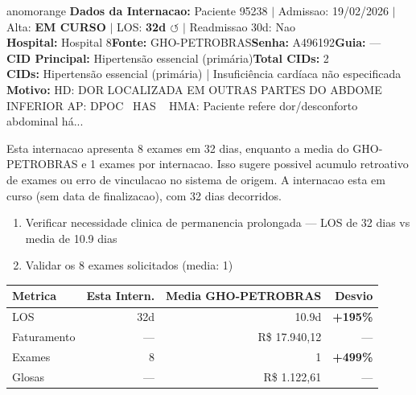 \documentclass[a4paper,10pt]{article}
\begin{document}
\begin{anomalycard}[Internacao 165987 | GHO-PETROBRAS | ALTO (z=3.84)]{anomorange}
\textbf{Dados da Internacao:} Paciente 95238 $\mid$ Admissao: 19/02/2026 $\mid$ Alta: \textcolor{anomorange}{\textbf{EM CURSO}} $\mid$ LOS: \textbf{32d \textcolor{anomorange}{$\circlearrowleft$}} $\mid$ Readmissao 30d: Nao\\
\textbf{Hospital:} Hospital 8\quad\textbf{Fonte:} GHO-PETROBRAS\quad\textbf{Senha:} A496192\quad\textbf{Guia:} ---\\
\textbf{CID Principal:} {\small Hipertensão essencial (primária)}\quad\textbf{Total CIDs:} 2\\

\textbf{CIDs:} {\scriptsize Hipertensão essencial (primária) | Insuficiência cardíaca não especificada}\\

\textbf{Motivo:} {\scriptsize HD:  DOR LOCALIZADA EM OUTRAS PARTES DO ABDOME INFERIOR  AP: DPOC   HAS    HMA: Paciente refere dor/desconforto abdominal há...}\\

\vspace{2pt}\begin{tcolorbox}[colback=severityred!20,colframe=anomorange,title={\textbf{Interpretacao de Negocio}},fonttitle=\bfseries\small,left=4pt,right=4pt,top=3pt,bottom=3pt]
{\small Esta internacao apresenta 8 exames em 32 dias, enquanto a media do GHO-PETROBRAS e 1 exames por internacao. Isso sugere possivel acumulo retroativo de exames ou erro de vinculacao no sistema de origem. A internacao esta em curso (sem data de finalizacao), com 32 dias decorridos.}
\end{tcolorbox}
\begin{tcolorbox}[colback=severityyellow!30,colframe=anomorange,title={\textbf{Recomendacoes Especificas}},fonttitle=\bfseries\small,left=4pt,right=4pt,top=3pt,bottom=3pt]
\begin{enumerate}[nosep,leftmargin=16pt]
\item {\small Verificar necessidade clinica de permanencia prolongada --- LOS de 32 dias vs media de 10.9 dias}
\item {\small Validar os 8 exames solicitados (media: 1)}
\end{enumerate}
\end{tcolorbox}
\begin{center}\begin{tabular}{l r r r}\toprule\textbf{Metrica} & \textbf{Esta Intern.} & \textbf{Media GHO-PETROBRAS} & \textbf{Desvio} \\\midrule
LOS & 32d & 10.9d & \textcolor{anomred}{\textbf{+195\%}} \\
Faturamento & --- & R\$ 17.940,12 & --- \\
Exames & 8 & 1 & \textcolor{anomred}{\textbf{+499\%}} \\
Glosas & --- & R\$ 1.122,61 & --- \\
\bottomrule\end{tabular}\end{center}


\end{anomalycard}
\end{document}
